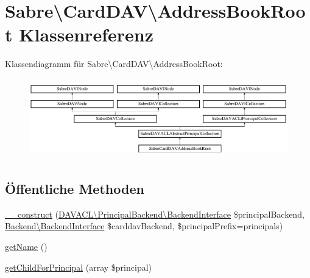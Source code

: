 \hypertarget{class_sabre_1_1_card_d_a_v_1_1_address_book_root}{}\section{Sabre\textbackslash{}Card\+D\+AV\textbackslash{}Address\+Book\+Root Klassenreferenz}
\label{class_sabre_1_1_card_d_a_v_1_1_address_book_root}
Klassendiagramm für Sabre\textbackslash{}Card\+D\+AV\textbackslash{}Address\+Book\+Root\+:\begin{figure}[H]
\begin{center}
\leavevmode
\includegraphics[height=3.495631cm]{class_sabre_1_1_card_d_a_v_1_1_address_book_root}
\end{center}
\end{figure}
\subsection*{Öffentliche Methoden}
\begin{DoxyCompactItemize}
\item 
\mbox{\hyperlink{class_sabre_1_1_card_d_a_v_1_1_address_book_root_adec87a327a988a236419d6a8aa16f136}{\+\_\+\+\_\+construct}} (\mbox{\hyperlink{interface_sabre_1_1_d_a_v_a_c_l_1_1_principal_backend_1_1_backend_interface}{D\+A\+V\+A\+C\+L\textbackslash{}\+Principal\+Backend\textbackslash{}\+Backend\+Interface}} \$principal\+Backend, \mbox{\hyperlink{interface_sabre_1_1_card_d_a_v_1_1_backend_1_1_backend_interface}{Backend\textbackslash{}\+Backend\+Interface}} \$carddav\+Backend, \$principal\+Prefix=\textquotesingle{}principals\textquotesingle{})
\item 
\mbox{\hyperlink{class_sabre_1_1_card_d_a_v_1_1_address_book_root_a9c3fa2825ad4bc965ae36eb83bf799bd}{get\+Name}} ()
\item 
\mbox{\hyperlink{class_sabre_1_1_card_d_a_v_1_1_address_book_root_a43dd09b7810691533702629578be4ccb}{get\+Child\+For\+Principal}} (array \$principal)
\end{DoxyCompactItemize}

